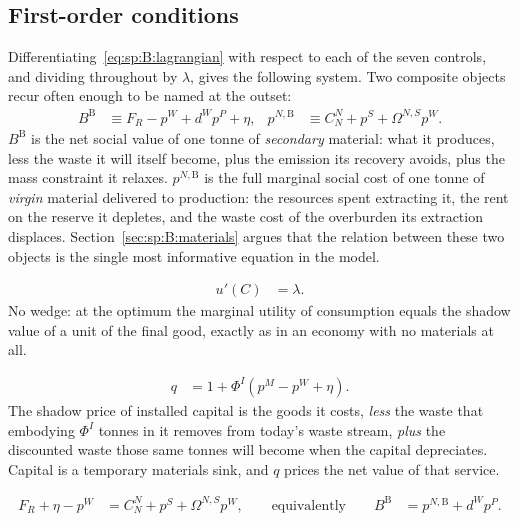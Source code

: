 \subsection{First-order conditions}\label{sec:sp:B:foc}

Differentiating~\eqref{eq:sp:B:lagrangian} with respect to each of the seven controls, and dividing
throughout by $\lambda$, gives the following system. Two composite objects recur often enough to be
named at the outset:
\begin{align}
B^{\mathrm B} &\equiv F_R-p^W+d^Wp^P+\eta,
&
p^{N,\mathrm B} &\equiv C^N_N+p^S+\Omega^{N,S}p^W .
\label{eq:sp:B:Bvalue}
\end{align}
$B^{\mathrm B}$ is the net social value of one tonne of \emph{secondary} material: what it produces, less the waste
it will itself become, plus the emission its recovery avoids, plus the mass constraint it relaxes.
$p^{N,\mathrm B}$ is the full marginal social cost of one tonne of \emph{virgin} material delivered to production:
the resources spent extracting it, the rent on the reserve it depletes, and the waste cost of the
overburden its extraction displaces. Section~\ref{sec:sp:B:materials} argues that the relation between
these two objects is the single most informative equation in the model.

\begin{align}
u'\!\left(C\right) &= \lambda .
\label{eq:sp:B:foc:C}
\end{align}
No wedge: at the optimum the marginal utility of consumption equals the shadow value of a unit of the
final good, exactly as in an economy with no materials at all.

\begin{align}
q &= 1+\Phi^I\left(p^M-p^W+\eta\right).
\label{eq:sp:B:foc:I}
\end{align}
The shadow price of installed capital is the goods it costs, \emph{less} the waste that embodying
$\Phi^I$ tonnes in it removes from today's waste stream, \emph{plus} the discounted waste those same
tonnes will become when the capital depreciates. Capital is a temporary materials sink, and $q$ prices
the net value of that service.

\begin{align}
F_R+\eta-p^W &= C^N_N+p^S+\Omega^{N,S}p^W,
\qquad\text{equivalently}\qquad
B^{\mathrm B} &= p^{N,\mathrm B}+d^Wp^P .
\label{eq:sp:B:foc:N}
\end{align}

